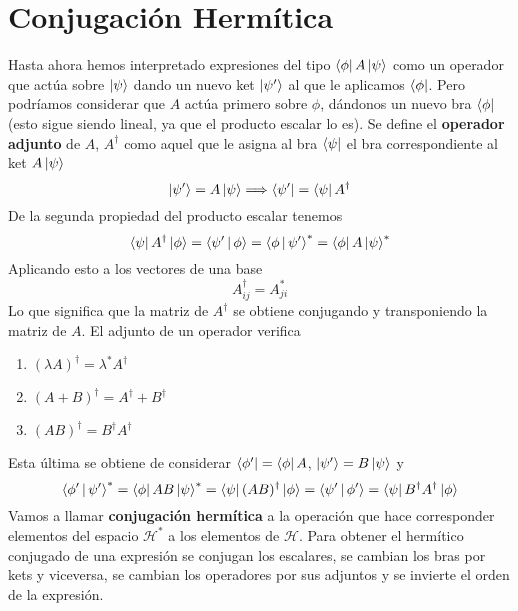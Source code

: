 \documentclass[12pt]{report}
\begin{document}
\section{Conjugación Hermítica}
Hasta ahora hemos interpretado expresiones del tipo $\bra{\phi }A\ket{\psi }$ como un operador que actúa sobre $\ket{\psi }$ dando un nuevo ket $\ket{\psi '}$ al que le aplicamos $\bra{\phi }$. Pero podríamos considerar que $A$ actúa primero sobre $\phi $, dándonos un nuevo bra $\bra{\phi }$ (esto sigue siendo lineal, ya que el producto escalar lo es). Se define el \textbf{operador adjunto} de $A$, $A^{\dagger}$ como aquel que le asigna al bra $\bra{\psi }$ el bra correspondiente al ket $A\ket{\psi }$
\begin{equation}
	\ket{\psi '}=A\ket{\psi }\Longrightarrow \bra{\psi '}=\bra{\psi }A^{\dagger}
\end{equation}
De la segunda propiedad del producto escalar tenemos
\[ \bra{\psi }A^{\dagger}\ket{\phi }=\Braket{\psi '|\phi}=\Braket{\phi |\psi '}^{\ast}=\bra{\phi }A\ket{\psi}^{\ast} \]
Aplicando esto a los vectores de una base
\begin{equation}
	A_{ij}^{\dagger}=A_{ji}^{\ast}
\end{equation}
Lo que significa que la matriz de $A^{\dagger}$ se obtiene conjugando y transponiendo la matriz de $A$. El adjunto de un operador verifica
\begin{enumerate}
	\item $(\lambda A)^{\dagger}=\lambda^{\ast}A^{\dagger}$
	\item $(A+B)^{\dagger}=A^{\dagger}+B^{\dagger}$
	\item $(AB)^{\dagger}=B^{\dagger}A^{\dagger}$
\end{enumerate}
Esta última se obtiene de considerar $\bra{\phi '}=\bra{\phi }A$, $\ket{\psi '}=B\ket{\psi }$ y
\[ \Braket{\phi '|\psi '}^{\ast}=\bra{\phi }AB\ket{\psi }^{\ast }=\bra{\psi }(AB)^{\dagger}\ket{\phi }=\Braket{\psi '|\phi '}=\bra{\psi }B^{\dagger}A^{\dagger}\ket{\phi} \]
Vamos a llamar \textbf{conjugación hermítica} a la operación que hace corresponder elementos del espacio $\mathcal{H}^{\ast}$ a los elementos de $\mathcal{H}$. Para obtener el hermítico conjugado de una expresión se conjugan los escalares, se cambian los bras por kets y viceversa, se cambian los operadores por sus adjuntos y se invierte el orden de la expresión.
\end{document}
